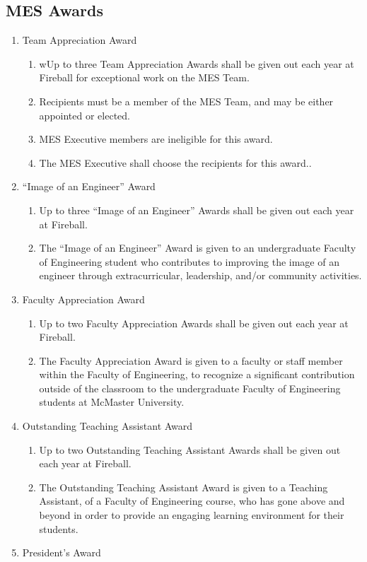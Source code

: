 \subsection{MES Awards}
\label{mes-awards}
\begin{enumerate}
 \item
  Team Appreciation Award

  \begin{enumerate}
   \item
    wUp to three Team Appreciation Awards shall be given out each year at Fireball for exceptional work on the MES Team.
   \item
    Recipients must be a member of the MES Team, and may be either appointed or elected.
   \item
    MES Executive members are ineligible for this award.
   \item
    The MES Executive shall choose the recipients for this award..
  \end{enumerate}
 \item
  ``Image of an Engineer'' Award

  \begin{enumerate}
   \item
    Up to three ``Image of an Engineer'' Awards shall be given out each year at Fireball.
   \item
    The ``Image of an Engineer'' Award is given to an undergraduate Faculty of Engineering student who contributes to improving the image of an engineer through extracurricular, leadership, and/or community activities.
  \end{enumerate}
 \item
  Faculty Appreciation Award

  \begin{enumerate}
   \item
    Up to two Faculty Appreciation Awards shall be given out each year at Fireball.
   \item
    The Faculty Appreciation Award is given to a faculty or staff member within the Faculty of Engineering, to recognize a significant contribution outside of the classroom to the undergraduate Faculty of Engineering students at McMaster University.
  \end{enumerate}
 \item
  Outstanding Teaching Assistant Award

  \begin{enumerate}
   \item
    Up to two Outstanding Teaching Assistant Awards shall be given out each year at Fireball.
   \item
    The Outstanding Teaching Assistant Award is given to a Teaching Assistant, of a Faculty of Engineering course, who has gone above and beyond in order to provide an engaging learning environment for their students.
  \end{enumerate}
 \item
  President's Award


\end{enumerate}
